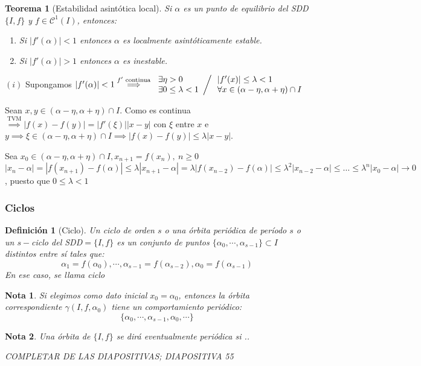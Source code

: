 \documentclass[11pt, a4paper]{article}
\makeatletter
\newif\IfInSansMode
\let\oldsf\sffamily
\renewcommand*{\sffamily}{\oldsf\mathversion{sans}\InSansModetrue}
\let\oldnorm\normalfont
\renewcommand*{\normalfont}{\oldnorm\InSansModefalse\mathversion{normal}}
\renewenvironment{proof}[1][\proofname] {\vspace{-15pt}\par\pushQED{\qed}\normalfont\topsep6\p@\@plus6\p@\relax\trivlist\item[\hskip\labelsep\it#1\@addpunct{.}]\ignorespaces}{\popQED\endtrivlist\@endpefalse}
\numberwithin{equation}{section}
\renewenvironment{proof}[1][\proofname] {\par\pushQED{\qed}\normalfont\topsep6\p@\@plus6\p@\relax\trivlist\item[\hskip\labelsep\itshape\sffamily#1\@addpunct{.}]\ignorespaces}{\popQED\endtrivlist\@endpefalse}
\theoremstyle{theorem-style}
\newtheorem{nth}{Teorema}[section]
\theoremstyle{definition-style}
\newtheorem{ndef}{Definición}[section]
\theoremstyle{remark-style}
\newtheorem*{nota}{Nota}
\theoremstyle{example-style}
\newenvironment{nlist}
{\begin{enumerate}
    \renewcommand\labelenumi{(\emph{\roman{enumi})}}}
  {\end{enumerate}}
\makeatother
\begin{document}
\begin{nth}[Estabilidad asintótica local]
	Si $\alpha$ es un punto de equilibrio del SDD $\{I,f\}$ y $f \in \mathcal{C}^1(I)$, entonces:
\begin{nlist}
 \item Si $|f'(\alpha)| < 1$ entonces $\alpha$ es localmente asintóticamente estable.
 \item Si $|f'(\alpha)| > 1$ entonces $\alpha$ es inestable.
\end{nlist}
\end{nth}
\begin{proof}
	$(i)$ Supongamos $|f'(\alpha)| < 1 \stackrel{f' \text{ continua}}{\implies} \left.\begin{array}{l}
		\exists \eta > 0 \\
		\exists 0 \leq \lambda < 1	
	\end{array}\right/\begin{array}{l}
		|f'(x)| \leq \lambda < 1\\
		\forall x \in (\alpha-\eta,\alpha+\eta)\cap I
\end{array}$

Sean $x,y \in (\alpha-\eta,\alpha+\eta)\cap I$. Como es continua $\stackrel{\text{TVM}}{\implies} |f(x)-f(y)| = |f'(\xi)||x-y|$ con $\xi$ entre $x$ e $y \implies \xi \in (\alpha-\eta,\alpha+\eta)\cap I \implies |f(x)-f(y)| \leq \lambda |x-y|$.

Sea $x_0 \in (\alpha-\eta,\alpha+\eta)\cap I, x_{n+1} = f(x_n),\ n \geq 0$
$|x_n-\alpha| = |f(x_{n+1})-f(\alpha)| \leq \lambda|x_{n+1}-\alpha|=\lambda|f(x_{n-2})-f(\alpha)| \leq \lambda^2|x_{n-2}-\alpha| \leq \dots \leq \lambda^n|x_0-\alpha|\rightarrow0$, puesto que $0 \leq \lambda < 1$
\end{proof}

\subsubsection{Ciclos}
\begin{ndef}[Ciclo]
	Un ciclo de orden $s$ o una órbita periódica de período $s$ o un $s-$ciclo del SDD$=\{I,f\}$ es un conjunto de puntos $\{\alpha_0, \cdots, \alpha_{s-1}\}\subset I$ distintos entre sí tales que:
	\[
	\alpha_1 = f(\alpha_0), \cdots, \alpha_{s-1}= f(\alpha_{s-2}), \alpha_0 = f(\alpha_{s-1})
	\]
	En ese caso, se llama ciclo
\end{ndef}
\begin{nota}
	Si elegimos como dato inicial $x_0 = \alpha_0$, entonces la órbita correspondiente $\gamma(I,f,\alpha_0)$ tiene un comportamiento periódico:
	\[
	\{\alpha_0,\cdots,\alpha_{s-1},\alpha_0,\cdots\}
	\]
\end{nota}
\begin{nota}
	Una órbita de $\{I,f\}$ se dirá eventualmente periódica si ..
	
	COMPLETAR DE LAS DIAPOSITIVAS; DIAPOSITIVA 55
\end{nota}
\end{document}
